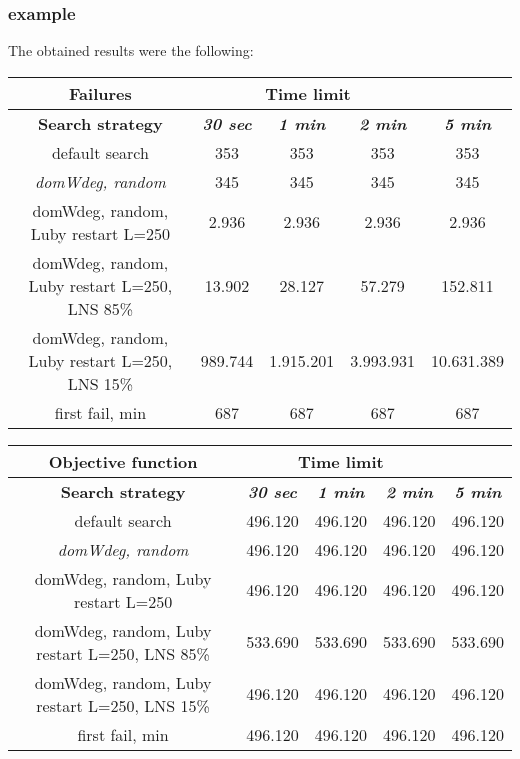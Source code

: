 \subsubsection{example}
The obtained results were the following:
{
\renewcommand{\arraystretch}{2}
\begin{longtable}[h]{| c | c | c | c | c |}
    \hline
    \textbf{Failures} & \multicolumn{3}{c}{Time limit} & \\
    \hline
    \textbf{Search strategy} & \textbf{\textit{30 sec}} & \textbf{\textit{1 min}} & \textbf{\textit{2 min}} & \textbf{\textit{5 min}} \\
    \hline
    \endhead
    default search                                &    353 &     353 &     353 &      353 \\
    \hline
    \textit{domWdeg, random}                      &    345 &     345 &     345 &      345 \\
    \hline
    domWdeg, random, Luby restart L=250           &   2.936 &    2.936 &    2.936 &     2.936 \\
    \hline
    domWdeg, random, Luby restart L=250, LNS 85\% &  13.902 &   28.127 &   57.279 &   152.811 \\
    \hline
    domWdeg, random, Luby restart L=250, LNS 15\% & 989.744 & 1.915.201 & 3.993.931 & 10.631.389 \\
    \hline
    first fail, min                               &    687 &     687 &     687 &      687 \\
    \hline
\end{longtable}
}

{
\renewcommand{\arraystretch}{2}
\begin{longtable}[h]{| c | c | c | c | c |}
    \hline
    \textbf{Objective function} & \multicolumn{3}{c}{Time limit} & \\
    \hline
    \textbf{Search strategy} & \textbf{\textit{30 sec}} & \textbf{\textit{1 min}} & \textbf{\textit{2 min}} & \textbf{\textit{5 min}} \\
    \hline
    \endhead
    default search                                & 496.120 & 496.120 & 496.120 & 496.120 \\
    \hline
    \textit{domWdeg, random}                      & 496.120 & 496.120 & 496.120 & 496.120 \\
    \hline
    domWdeg, random, Luby restart L=250           & 496.120 & 496.120 & 496.120 & 496.120 \\
    \hline
    domWdeg, random, Luby restart L=250, LNS 85\% & 533.690 & 533.690 & 533.690 & 533.690 \\
    \hline
    domWdeg, random, Luby restart L=250, LNS 15\% & 496.120 & 496.120 & 496.120 & 496.120 \\
    \hline
    first fail, min                               & 496.120 & 496.120 & 496.120 & 496.120 \\
    \hline
\end{longtable}
}

